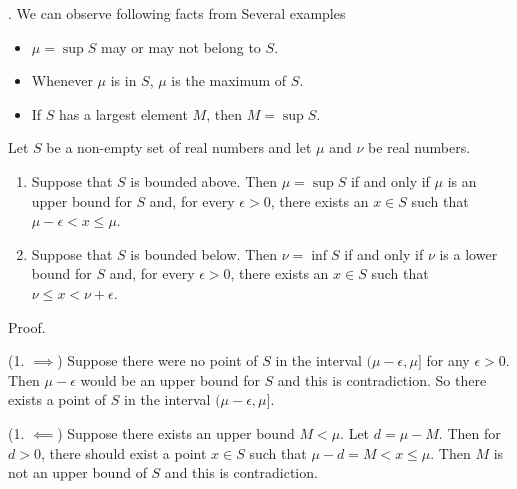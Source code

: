 \documentclass[8pt]{beamer}
\begin{document}
\begin{frame}{.}
    We can observe following facts from Several examples
    \begin{itemize}
        \item $\mu = \sup S$ may or may not belong to $S$.
        \item Whenever $\mu$ is in $S$, $\mu$ is the maximum of $S$.
        \item If $S$ has a largest element $M$, then $M = \sup S$.
    \end{itemize}

    \begin{theorem} \label{th:1}
        Let $S$ be a non-empty set  of real numbers and let $\mu$ and $\nu$ be real numbers.
        \begin{enumerate}
            \item Suppose that $S$ is bounded above. Then $\mu = \sup S$ if and only if $\mu$ is an upper bound for $S$ and, for every $\epsilon >0$, there exists an $x \in S$ such that $\mu - \epsilon < x \leq \mu$.
            \item Suppose that $S$ is bounded below. Then $\nu = \inf S$ if and only if $\nu$ is a lower bound for $S$ and, for every $\epsilon > 0$, there exists an $x \in S$ such that $\nu \leq x < \nu + \epsilon$.
        \end{enumerate}

        Proof.

        (1. $\implies$) Suppose there were no point of $S$ in the interval $(\mu - \epsilon,\mu]$ for any $\epsilon >0$.
        Then $\mu-\epsilon$ would be an upper bound for $S$ and this is contradiction.
        So there exists a point of $S$ in the interval $(\mu - \epsilon, \mu]$.

        (1. $\impliedby$) Suppose there exists an upper bound $M < \mu$.
        Let $d = \mu - M$.
        Then for $d >0$, there should exist a point $x \in S$ such that $\mu - d = M < x \leq \mu$.
        Then $M$ is not an upper bound of $S$ and this is contradiction.
    \end{theorem}
\end{frame}
\end{document}
